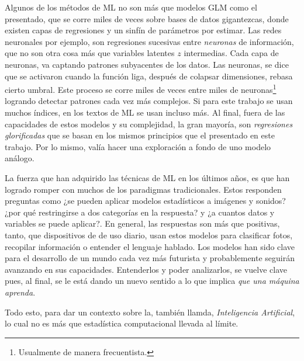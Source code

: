 \documentclass[../Main/Main.tex]{subfiles}
\begin{document}
Algunos de los métodos de ML no son más que modelos GLM como el presentado, que se corre miles de veces sobre bases de datos gigantezcas, donde existen capas de regresiones y un sinfín de parámetros por estimar. Las redes neuronales por ejemplo, son regresiones sucesivas entre \textit{neuronas} de información, que no son otra cosa más que variables latentes $z$ intermedias. Cada capa de neuronas, va captando patrones subyacentes de los datos. Las neuronas, se dice que se activaron cuando la función liga, después de colapsar dimensiones, rebasa cierto umbral. Este proceso se corre miles de veces entre miles de neuronas\footnote{Usualmente de manera frecuentista.} logrando detectar patrones cada vez más complejos. Si para este trabajo se usan muchos índices, en los textos de ML se usan incluso más. Al final, fuera de las capacidades de estos modelos y su complejidad, la gran mayoría, son \textit{regresiones glorificadas} que se basan en los mismos principios que el presentado en este trabajo. Por lo mismo, valía hacer una exploración a fondo de uno modelo análogo.

La fuerza que han adquirido las técnicas de ML en los últimos años, es que han logrado romper con muchos de los paradigmas tradicionales. Estos responden preguntas como ¿se pueden aplicar modelos estadísticos a imágenes y sonidos? ¿por qué restringirse a dos categorías en la respuesta? y ¿a cuantos datos y variables se puede aplicar?. En general, las respuestas son más que positivas, tanto, que dispositivos de de uso diario, usan estos modelos para clasificar fotos, recopilar información o entender el lenguaje hablado. Los modelos han sido clave para el desarrollo de un mundo cada vez más futurista y probablemente seguirán avanzando en sus capacidades. Entenderlos y poder analizarlos, se vuelve clave  pues, al final, se le está dando un nuevo sentido a lo que implica \textit{que una máquina aprenda}.

 Todo esto, para dar un contexto sobre la, también llamda, \textit{Inteligencia Artificial}, lo cual no es más que estadística computacional llevada al límite.
\end{document}
